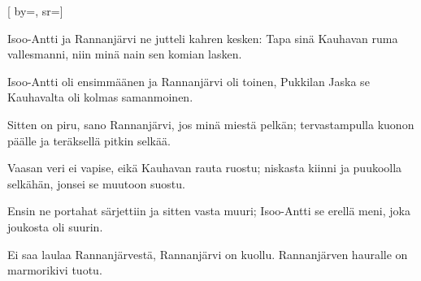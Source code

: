 
[
	by={},
	sr={}]

\beginverse*
Isoo-Antti ja Rannanjärvi
ne jutteli kahren kesken:
Tapa sinä Kauhavan ruma vallesmanni,
niin minä nain sen komian lasken.
\endverse

\beginverse*
Isoo-Antti oli ensimmäänen
ja Rannanjärvi oli toinen,
Pukkilan Jaska se Kauhavalta
oli kolmas samanmoinen.
\endverse

\beginverse*
Sitten on piru, sano Rannanjärvi,
jos minä miestä pelkän;
tervastampulla kuonon päälle
ja teräksellä pitkin selkää.
\endverse

\beginverse*
Vaasan veri ei vapise,
eikä Kauhavan rauta ruostu;
niskasta kiinni ja puukoolla selkähän,
jonsei se muutoon suostu.
\endverse

\beginverse*
Ensin ne portahat särjettiin
ja sitten vasta muuri;
Isoo-Antti se erellä meni,
joka joukosta oli suurin.
\endverse

\beginverse*
Ei saa laulaa Rannanjärvestä,
Rannanjärvi on kuollu.
Rannanjärven hauralle
on marmorikivi tuotu.
\endverse
\endsong